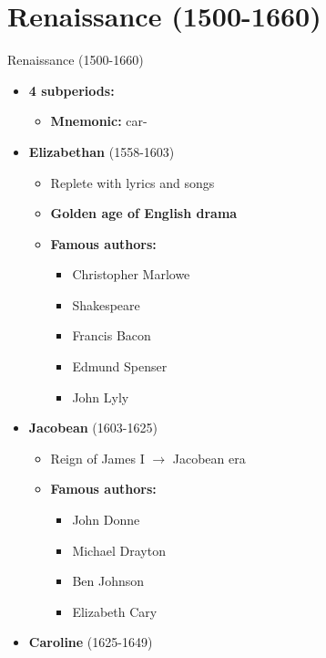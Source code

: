\documentclass[
  12pt,
  ignorenonframetext,
  progressbar=frametitle]{beamer}
\providecommand{\tightlist}{%
  \setlength{\itemsep}{0pt}\setlength{\parskip}{0pt}}
\begin{document}
\section{Renaissance (1500-1660)}
\begin{frame}[allowframebreaks]
{Renaissance (1500-1660)}
\protect\hypertarget{renaissance-1500-1660}{}
\begin{itemize}
\tightlist
\item
  \textbf{4 subperiods:}

  \begin{itemize}
  \tightlist
  \item
    \textbf{Mnemonic:}  car-
  \end{itemize}
\item
  \textbf{Elizabethan} (1558-1603)

  \begin{itemize}
  \tightlist
  \item
    Replete with lyrics and songs
  \item
    \textbf{Golden age of English drama}
  \item
    \textbf{Famous authors:}

    \begin{itemize}
    \tightlist
    \item
      Christopher Marlowe
    \item
      Shakespeare
    \item
      Francis Bacon
    \item
      Edmund Spenser
    \item
      John Lyly
    \end{itemize}
  \end{itemize}
\item
  \textbf{Jacobean} (1603-1625)

  \begin{itemize}
  \tightlist
  \item
    Reign of James I \(\rightarrow\) Jacobean era
  \item
    \textbf{Famous authors:}

    \begin{itemize}
    \tightlist
    \item
      John Donne
    \item
      Michael Drayton
    \item
      Ben Johnson
    \item
      Elizabeth Cary
    \end{itemize}
  \end{itemize}
\item
  \textbf{Caroline} (1625-1649)


\end{itemize}
\end{frame}
\end{document}
